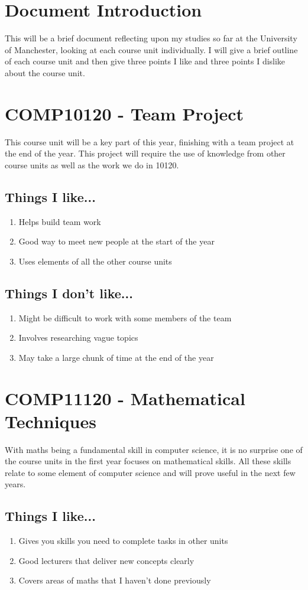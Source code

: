 \documentclass[a4paper]{article}
\begin{document}
\tableofcontents
\newpage
\section{Document Introduction}
This will be a brief document reflecting upon my studies so far at the University of Manchester, looking at each course unit
individually. I will give a brief outline of each course unit and then give three points I like and three points I dislike
about the course unit.

\section{COMP10120 - Team Project}
This course unit will be a key part of this year, finishing with a team project at the end of the year. This project will
require the use of knowledge from other course units as well as the work we do in 10120.
\subsection{Things I like...}
\begin{enumerate}
\item Helps build team work
\item Good way to meet new people at the start of the year
\item Uses elements of all the other course units
\end{enumerate}
\subsection{Things I don't like...}
\begin{enumerate}
\item Might be difficult to work with some members of the team
\item Involves researching vague topics
\item May take a large chunk of time at the end of the year
\end{enumerate}

\section{COMP11120 - Mathematical Techniques}
With maths being a fundamental skill in computer science, it is no surprise one of the course units in the first year focuses on
mathematical skills. All these skills relate to some element of computer science and will prove useful in the next few years.
\subsection{Things I like...}
\begin{enumerate}
\item Gives you skills you need to complete tasks in other units
\item Good lecturers that deliver new concepts clearly
\item Covers areas of maths that I haven't done previously
\end{enumerate}
\end{document}
